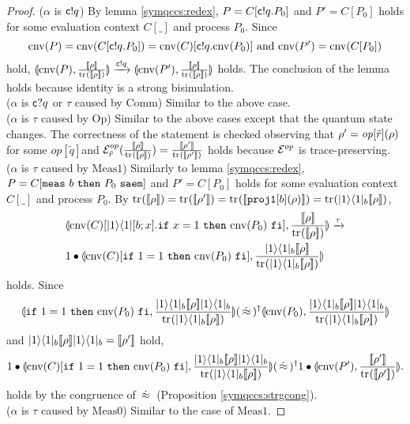 \begin{proof}
 ($\alpha$ is $\mathsf{c}! q$)
 By lemma \ref{symqccs:redex}, $P = C[\mathsf{c}! q.P_0]$ and 
 $P' = C[P_0]$ holds for some evaluation
 context $C[\_]$ and process $P_0$.
 Since 
 \[
 \mathrm{cnv}(P) = \mathrm{cnv}(C[\mathsf{c}! q.P_0]) =
 \mathrm{cnv}(C)[\mathsf{c}! q.\mathrm{cnv}(P_0)] \mbox{ and }
 \mathrm{cnv}(P') = \mathrm{cnv}(C[P_0])
 \]
 hold,
 $\con{\cnv{P}}
      {\frac{\braw{\rho}}{\tr{}{\braw{\rho}}}}
 \xrightarrow{\sndq{c}{q}}
 \con{\cnv{P'}}{\frac{\braw{\rho}}{\tr{}{\braw{\rho}}}}$ holds. 
 The conclusion of the lemma holds because identity is a 
strong bisimulation.
 \\
 ($\alpha$ is $\mathsf{c}? q$ or $\tau$ caused by
 $\mathrm{Comm}$) Similar to the above case.\\
 ($\alpha$ is $\tau$ caused by $\mathrm{Op}$) Similar to the above
 cases
 except that the quantum state changes. The correctness of 
 the statement is checked observing that $\rho' =
 \mathit{op}[\tilde r]{\mathtt{(}\rho\mathtt{)}}$ for some
 $\mathit{op}[\tilde q]$and
 $\E^{op}_{\tilde r}(\frac{\braw{\rho}}{\tr{}{\braw{\rho}}}) =
 \frac{\braw{\rho'}}{\tr{}{\braw{\rho'}}}$ holds because $\mathcal{E}^{op}$ is
 trace-preserving.\\
 ($\alpha$ is $\tau$ caused by $\mathrm{Meas1}$)
 Similarly to lemma \ref{symqccs:redex}, $P = C[{\tt meas}~b~{\tt then}~P_0~{\tt saem}]$ and 
 $P' = C[P_0]$ holds for some evaluation
 context $C[\_]$ and process $P_0$.
 By $\tr{}{\braw{\rho}} = \tr{}{\braw{\rho'}} = 
 \tr{}{\braw{\mathtt{proj1}[b](\rho)}} = 
 \tr{}{\ket{1}\bra{1}_b\braw{\rho}}$,
\begin{align*}
 &\con{\cnv{C}[\ket{1}\bra{1}[b;x].\myif{x = 1}{\cnv{P_0}}]}
 {\frac{\braw{\rho}}{\tr{}{\braw{\rho}}}} \xrightarrow{\tau}\\
 &1 \bullet \con{\cnv{C}[\myif{1=1}{\cnv{P_0}}]}
 {\frac{\ket{1}\bra{1}_b\braw{\rho}}
  {\tr{}{\ket{1}\bra{1}_b\braw{\rho}}}}
\end{align*}
 holds.
 Since
 \[
\con{\myif{1=1}{\cnv{P_0}}}
{\frac{\ket{1}\bra{1}_b\braw{\rho}\ket{1}\bra{1}_b}
      {\tr{}{\ket{1}\bra{1}_b\braw{\rho}}}}
 (\strg)^\dagger
\con{\cnv{P_0}}{\frac{\ket{1}\bra{1}_b\braw{\rho}\ket{1}\bra{1}_b}
{\tr{}{\ket{1}\bra{1}_b\braw{\rho}}}}
\]
 and $|1\rangle\langle 1|_b[\![\rho]\!]|1\rangle\langle 1|_b = [\![\rho']\!]$
 hold, 
\[
 1 \bullet \con{\cnv{C}[\myif{1 = 1}{\cnv{P_0}}]}
 {\frac{\ket{1}\bra{1}_b\braw{\rho}\ket{1}\bra{1}_b}
       {\tr{}{\ket{1}\bra{1}_b\braw{\rho}}}} (\strg)^\dagger
1 \bullet \con{\cnv{P'}}{\frac{\braw{\rho'}}{\tr{}{\braw{\rho'}}}}
.
\]
holds by the congruence of $\,\dot\approx\,$ (Proposition \ref{symqccs:strgcong}).
\\
 ($\alpha$ is $\tau$ caused by $\mathrm{Meas0}$) Similar to the
 case of $\mathrm{Meas1}$.
\end{proof}

